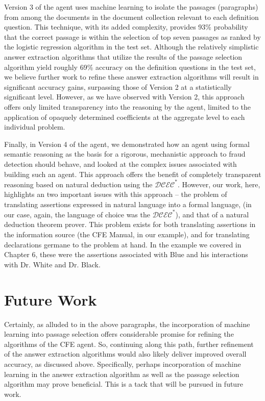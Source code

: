 Version 3 of the agent uses machine learning to isolate the passages (paragraphs) from among the documents in the document collection relevant to each definition question. This technique, with its added complexity, provides 93\% probability that the correct passage is within the selection of top seven passages as ranked by the logistic regression
algorithm in the test set. Although the relatively simplistic answer extraction algorithms that utilize the results of the passage selection algorithm yield roughly 69\% accuracy on the definition questions in the test set, we believe further work to refine these answer extraction algorithms will result in significant accuracy gains, surpassing those of Version 2 at a statistically significant level. However, as we have observed with Version 2, this approach offers only limited transparency into the reasoning by the agent, limited to the application of opaquely determined coefficients at the aggregate level to each individual problem.

Finally, in Version 4 of the agent, we demonstrated how an agent using formal semantic reasoning as the basis for a rigorous, mechanistic approach to fraud detection should behave, and looked at the complex issues associated with building such an agent.  This approach offers the benefit of completely transparent reasoning based on natural deduction using the $\mathcal{DCEC}^\ast$.  However, our work, here, highlights an two important issues with this approach -- the problem of translating assertions expressed in natural language into a formal language, (in our case, again, the language of choice was the $\mathcal{DCEC}^\ast$), and that of a natural deduction theorem prover.  This problem exists for both translating assertions in the information source (the CFE Manual, in our example), and for translating declarations germane to the problem at hand. In the example we covered in Chapter 6, these were the assertions associated with Blue and his interactions with Dr. White and Dr. Black.

\section{Future Work}

Certainly, as alluded to in the above paragraphs, the incorporation of machine learning into passage selection offers considerable promise for refining the algorithms of the CFE agent. So, continuing along this path, further refinement of the answer extraction algorithms would also likely deliver improved overall accuracy, as discussed above. Specifically, perhaps incorporation of machine learning in the answer extraction algorithm as well as the passage selection algorithm may prove beneficial. This is a tack that will be pursued in future work.  

